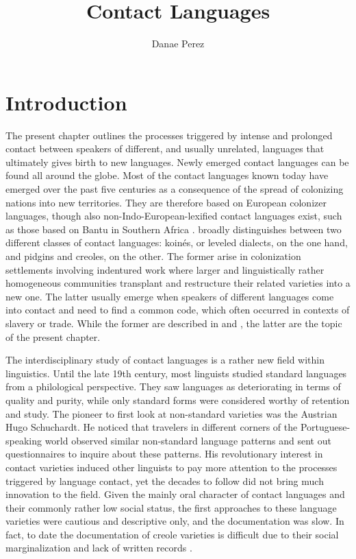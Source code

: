 \documentclass[output=paper,
modfonts
]{langscibook}
\title{Contact Languages}
\author{%
 Danae Perez\affiliation{Zurich University of Applied Sciences}
}
\begin{document}
\maketitle


\section{Introduction}

The present chapter outlines the processes triggered by intense and prolonged contact between speakers of different, and usually unrelated, languages that ultimately gives birth to new languages. Newly emerged contact languages can be found all around the globe. Most of the contact languages known today have emerged over the past five centuries as a consequence of the spread of colonizing nations into new territories. They are therefore based on European colonizer languages, though also non-Indo-European-lexified contact languages exist, such as those based on Bantu in Southern Africa \parencite{apics}. \cite{meshtrie2017slavery} broadly distinguishes between two different classes of contact languages: koinés, or leveled dialects, on the one hand, and pidgins and creoles, on the other. The former arise in colonization settlements involving indentured work where larger and linguistically rather homogeneous communities transplant and restructure their related varieties into a new one. The latter usually emerge when speakers of different languages come into contact and need to find a common code, which often occurred in contexts of slavery or trade. While the former are described in \cite{ruchetal_tv} and \cite{jeszenskyetal_tv}, 
the latter are the topic of the present chapter.

The interdisciplinary study of contact languages is a rather new field within linguistics. Until the late 19th century, most linguists studied standard languages from a philological perspective. They saw languages as deteriorating in terms of quality and purity, while only standard forms were considered worthy of retention and study. The pioneer to first look at non-standard varieties was the Austrian Hugo Schuchardt. He noticed that travelers in different corners of the Portuguese-speaking world observed similar non-standard language patterns and sent out questionnaires to inquire about these patterns. His revolutionary interest in contact varieties induced other linguists to pay more attention to the processes triggered by language contact, yet the decades to follow did not bring much innovation to the field. Given the mainly oral character of contact languages and their commonly rather low social status, the first approaches to these language varieties were cautious and descriptive only, and the documentation was slow. In fact, to date the documentation of creole varieties is difficult due to their social marginalization and lack of written records \citep[cf.][]{garrett2006contact}.
\end{document}
